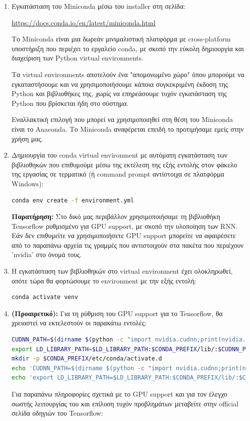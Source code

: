 \documentclass[12pt,a4paper]{article}
\begin{document}
\begin{enumerate}
    \item Εγκατάσταση του Miniconda μέσω του installer στη σελίδα:

        \textcolor{blue}{\href{https://docs.conda.io/en/latest/miniconda.html}{https://docs.conda.io/en/latest/miniconda.html}}

         Το Miniconda είναι μια δωρεάν μινιμαλιστική πλατφόρμα με cross-platform υποστήριξη που περιέχει το εργαλείο conda, με σκοπό την εύκολη δημιουργία και διαχείριση των Python virtual environments.

         Τα virtual environments αποτελούν ένα "απομονωμένο χώρο" όπου μπορούμε να εγκαταστήσουμε και να χρησιμοποιήσουμε κάποια συγκεκριμένη έκδοση της Python και βιβλιοθήκες της, χωρίς να επηρεάσουμε τυχόν εγκατάσταση της Python που βρίσκεται ήδη στο σύστημα. 

         Εναλλακτική επιλογή που μπορεί να χρησιμοποιηθεί στη θέση του Miniconda είναι το Anaconda. Το Miniconda αναφέρεται επειδή το προτιμήσαμε εμείς στην χρήση μας.

     \item Δημιουργία του conda virtual environment με αυτόματη εγκατάσταση των βιβλιοθηκών που επιθυμούμε μέσω της εκτέλεση της εξής εντολής στον φάκελο της εργασίας σε τερματικό (ή command prompt αντίστοιχα σε πλατφόρμα Windows):

         \begin{lstlisting}[language=Bash]
conda env create -f environment.yml\end{lstlisting}

\textbf{Παρατήρηση:} Στο δικό μας περιβάλλον χρησιμοποιήσαμε τη βιβλιοθήκη Tensorflow ρυθμισμένο για GPU support, με σκοπό την υλοποίηση των RNN. Εάν δεν επιθυμείτε να χρησιμοποιήσετε GPU support μπορείτε να αφαιρέσετε από το παραπάνω αρχεία τις γραμμές που αντιστοιχούν στα πακέτα που περιέχουν 'nvidia' στο όνομά τους.

     \item Η εγκατάσταση των βιβλιοθηκών στο virtual environment έχει ολοκληρωθεί, οπότε τώρα θα φορτώσουμε το environment με την εξής εντολή:
         \begin{lstlisting}[language=Bash]
conda activate venv\end{lstlisting}
\item \textbf{(Προαιρετικό):} Για τη ρύθμιση του GPU support για το Tensorflow, θα χρειαστεί να εκτελεστούν οι παρακάτω εντολές:
         \begin{lstlisting}[language=Bash]
CUDNN_PATH=$(dirname $(python -c "import nvidia.cudnn;print(nvidia.cudnn.__file__)"))
export LD_LIBRARY_PATH=$LD_LIBRARY_PATH:$CONDA_PREFIX/lib/:$CUDNN_PATH/lib
mkdir -p $CONDA_PREFIX/etc/conda/activate.d
echo 'CUDNN_PATH=$(dirname $(python -c "import nvidia.cudnn;print(nvidia.cudnn.__file__)"))' >> $CONDA_PREFIX/etc/conda/activate.d/env_vars.sh
echo 'export LD_LIBRARY_PATH=$LD_LIBRARY_PATH:$CONDA_PREFIX/lib/:$CUDNN_PATH/lib' >> $CONDA_PREFIX/etc/conda/activate.d/env_vars.sh
\end{lstlisting}
    Για παραπάνω πληροφορίες σχετικά με το GPU support και για τον έλεγχο σωστής λειτουργίας του και επίλυση τυχόν προβλημάτων μεταβείτε στην official σελίδα οδηγιών του Tensorflow:


\end{enumerate}
\end{document}

